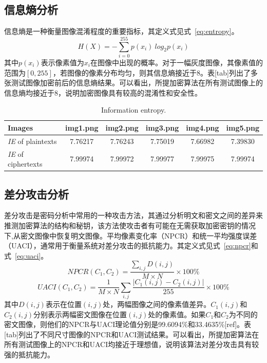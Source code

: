 \subsection{信息熵分析}
信息熵是一种衡量图像混淆程度的重要指标，其定义式见式~\eqref{eq:entropy}。
\begin{equation}
\label{eq:entropy}
H(X) = - \sum_{i=0}^{255} p(x_i) \
log_2 p(x_i)
\end{equation}
其中$p(x_i)$表示像素值为$x_i$在图像中出现的概率。对于一幅灰度图像，其像素值的范围为$[0,255]$，若图像的像素分布均匀，则其信息熵接近于8。表[tab]列出了多张测试图像加密前后的信息熵结果。可以看出，所提加密算法在所有测试图像上的信息熵均接近于8，说明加密图像具有较高的混淆性和安全性。


\begin{table}[htbp]
\captionsetup{singlelinecheck=false, justification=raggedright}
\caption{Information entropy.}
\label{tab:entropy}
\begin{tabular}{lccccc}
\toprule
Images & img1.png & img2.png & img3.png & img4.png & img5.png \\
\midrule
\textit{IE} of plaintexts  & 7.76217 & 7.76243 & 7.75019 & 7.66982 & 7.39830 \\
\textit{IE} of ciphertexts & 7.99974 & 7.99972 & 7.99977 & 7.99975 & 7.99974 \\
\bottomrule
\end{tabular}
\end{table}


\subsection{差分攻击分析}
差分攻击是密码分析中常用的一种攻击方法，其通过分析明文和密文之间的差异来推测加密算法的结构和秘钥，该方法使攻击者有可能在无需获取加密密钥的情况下,从密文图像中恢复明文图像。平均像素变化率（NPCR）和统一平均强度误差（UACI），通常用于衡量系统对差分攻击的抵抗能力。其定义式见式~\eqref{eq:npcr}和式~\eqref{eq:uaci}。
\begin{equation}
\label{eq:npcr}
NPCR(C_1,C_2) = \frac{\sum_{i,j} D(i,j)}{M \times N} \times 100\%
\end{equation}
\begin{equation}
\label{eq:uaci}
UACI(C_1,C_2) = \frac{1}{M \times N} \sum_{i,j} \frac{|C_1(i,j) - C_2(i,j)|}{255} \times 100\%
\end{equation}
其中$D(i,j)$表示在位置$(i,j)$处，两幅图像之间的像素值差异。$C_1(i,j)$和$C_2(i,j)$分别表示两幅密文图像在位置$(i,j)$处的像素值。如果$C_1$和$C_2$为不同的密文图像，则他们的NPCR与UACI理论值分别是99.6094\%和33.4635\%[ref]。表[tab]列出了不同尺寸图像的NPCR和UACI测试结果。可以看出，所提加密算法在所有测试图像上的NPCR和UACI均接近于理想值，说明该算法对差分攻击具有较强的抵抗能力。
